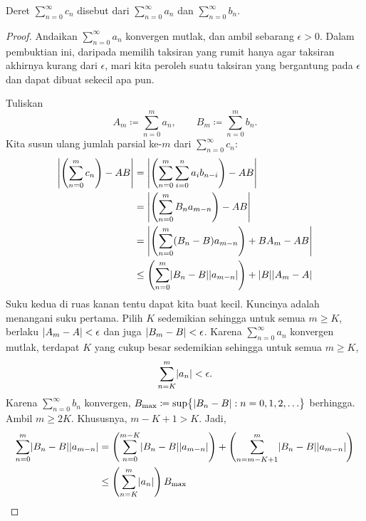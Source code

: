 Deret $\sum_{n=0}^\infty c_n$ disebut \emph{} dari
$\sum_{n=0}^\infty a_n$ dan $\sum_{n=0}^\infty b_n$.

\begin{proof}
Andaikan $\sum_{n=0}^\infty a_n$ konvergen mutlak, dan ambil sebarang
$\epsilon > 0$.
Dalam pembuktian ini, daripada memilih taksiran yang rumit hanya agar
taksiran akhirnya kurang dari $\epsilon$,
mari kita peroleh suatu taksiran yang bergantung pada $\epsilon$
dan dapat dibuat sekecil apa pun.

Tuliskan
\begin{equation*}
A_m \coloneqq \sum_{n=0}^m a_n , \qquad B_m \coloneqq \sum_{n=0}^m b_n .
\end{equation*}
Kita susun ulang jumlah parsial ke-$m$ dari $\sum_{n=0}^\infty c_n$:
\begin{equation*}
\begin{split}
\left\lvert {\left(\sum_{n=0}^m c_n \right) - AB} \right\rvert
& =
\left\lvert {\left( \sum_{n=0}^m \sum_{i=0}^n a_i b_{n-i} \right) - AB} \right\rvert
\\
& =
\left\lvert {\left( \sum_{n=0}^m
  B_n a_{m-n} \right) - AB} \right\rvert
\\
& =
\left\lvert {\left( \sum_{n=0}^m
  ( B_n -  B ) a_{m-n} \right)
    + B A_m - AB} \right\rvert
\\
& \leq
\left(
\sum_{n=0}^m
  \lvert { B_n -  B } \rvert \lvert {a_{m-n}} \rvert
\right)
+
\lvert {B} \rvert\lvert {A_m - A} \rvert
\end{split}
\end{equation*}
Suku kedua di ruas kanan tentu dapat kita buat kecil.
Kuncinya adalah menangani suku pertama.
Pilih $K$ sedemikian sehingga untuk semua $m \geq K$, berlaku
$\lvert {A_m - A} \rvert < \epsilon$ dan
juga
$\lvert {B_m - B} \rvert < \epsilon$.
Karena $\sum_{n=0}^\infty a_n$ konvergen mutlak,
terdapat $K$ yang cukup besar sedemikian sehingga
untuk semua $m \geq K$,
\begin{equation*}
\sum_{n=K}^m \lvert {a_n} \rvert < \epsilon .
\end{equation*}
Karena $\sum_{n=0}^\infty b_n$ konvergen,
$B_{\text{max}} \coloneqq \sup \bigl\{ \lvert { B_n - B } \rvert : n = 0,1,2,\ldots
\bigr\}$
berhingga.  Ambil $m \geq 2K$.
Khususnya, $m-K+1 > K$.  Jadi,
\begin{equation*}
\begin{split}
\sum_{n=0}^m
  \sabs{ B_n -  B } \sabs{a_{m-n}}
& =
\left(
\sum_{n=0}^{m-K}
  \sabs{ B_n -  B } \sabs{a_{m-n}}
\right)
+
\left(
\sum_{n=m-K+1}^m
  \sabs{ B_n -  B } \sabs{a_{m-n}}
\right)
\\
& \leq
\left(
\sum_{n=K}^m
\sabs{a_{n}}
\right)
B_{\text{max}}

\end{split}
\end{equation*}
\end{proof}
